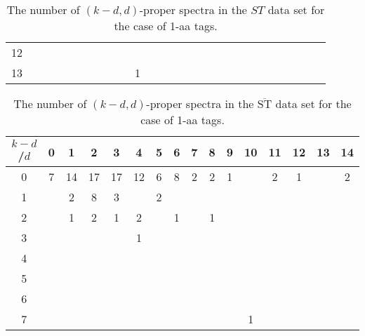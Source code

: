 \documentclass{article}[12pt]
\def\STbar{{\overline{\mathrm{ST}}}}
\begin{document}
\begin{landscape}
\begin{table}[h]
{\begin{tabular}{|c|c|
c|c|c|c|c|c|c|c|c|c|c|c|c|c|c|c|c|c|c|c|c|c|c|c|c|}
12  &  &  &  &  &  &  &  &  &  &  &  &  &  &  &  &  &  &  &  &  &  &  &  &  &  & \\

13  &  &  &  &  &  &  &  &  &  & 1 &  &  &  &  &  &  &  &  &  &  &  &  &  &  &  & \\

  \hline
\end{tabular}
\par}
\centering
\caption{The number of $(k-d,d)$-proper spectra in the $ST$ data set for the case of 1-aa tags.}
\vspace{3mm}
\label{table:kd-1-proper-ST}
\end{table}
\end{landscape}
\begin{landscape}

\begin{table}[h]\footnotesize
{\centering
\begin{tabular}{|c|c|
c|c|c|c|c|c|c|c|c|c|c|c|c|c|}
  \hline
  $k-d$/$d$ 
 & 0 & 1 & 2 & 3 & 4 & 5 & 6 & 7 & 8 & 9 & 10 & 11 & 12 & 13 & 14\\

  \hline
  \hline

0  & 7 & 14 & 17 & 17 & 12 & 6 & 8 & 2 & 2 & 1 &  & 2 & 1 &  & 2\\

1  &  & 2 & 8 & 3 &  & 2 &  &  &  &  &  &  &  &  & \\

2  &  & 1 & 2 & 1 & 2 &  & 1 &  & 1 &  &  &  &  &  & \\

3  &  &  &  &  & 1 &  &  &  &  &  &  &  &  &  & \\

4  &  &  &  &  &  &  &  &  &  &  &  &  &  &  & \\

5  &  &  &  &  &  &  &  &  &  &  &  &  &  &  & \\

6  &  &  &  &  &  &  &  &  &  &  &  &  &  &  & \\

7  &  &  &  &  &  &  &  &  &  &  & 1 &  &  &  & \\

  \hline
\end{tabular}
\par}
\centering
\caption{The number of $(k-d,d)$-proper spectra in the $\STbar$ data set for the case of 1-aa tags.}
\vspace{3mm}
\label{table:kd-1-proper-ST-bar}
\end{table}
\end{landscape}
\end{document}
